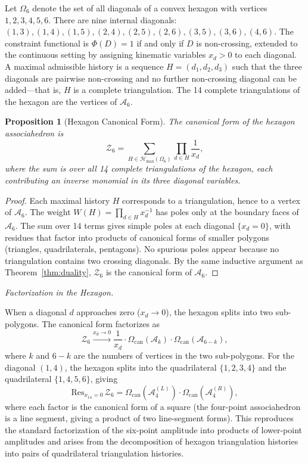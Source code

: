 \documentclass[12pt, oneside]{amsart}
\theoremstyle{plain}
\newtheorem{proposition}[theorem]{Proposition}
\theoremstyle{definition}
\theoremstyle{remark}
\newcommand{\Phif}{\Phi}
\newcommand{\OmKS}{\Omega}
\newcommand{\CF}{\Omega_{\mathrm{can}}}
\newcommand{\Hmax}{\mathcal{H}_{\max}}
\begin{document}
Let $\OmKS_6$ denote the set of all diagonals of a convex hexagon with vertices $1, 2, 3, 4, 5, 6$. There are nine internal diagonals: $(1,3), (1,4), (1,5), (2,4), (2,5), (2,6), (3,5), (3,6), (4,6)$. The constraint functional is $\Phif(D) = 1$ if and only if $D$ is non-crossing, extended to the continuous setting by assigning kinematic variables $x_d > 0$ to each diagonal. A maximal admissible history is a sequence $H = (d_1, d_2, d_3)$ such that the three diagonals are pairwise non-crossing and no further non-crossing diagonal can be added---that is, $H$ is a complete triangulation. The 14 complete triangulations of the hexagon are the vertices of $\mathcal{A}_6$.

\begin{proposition}[Hexagon Canonical Form]
\label{prop:hexagon}
The canonical form of the hexagon associahedron is
\begin{equation}
\label{eq:hexagon-Z}
  \mathcal{Z}_6 = \sum_{H \in \Hmax(\OmKS_6)} \prod_{d \in H} \frac{1}{x_d},
\end{equation}
where the sum is over all 14 complete triangulations of the hexagon, each contributing an inverse monomial in its three diagonal variables.
\end{proposition}

\begin{proof}
Each maximal history $H$ corresponds to a triangulation, hence to a vertex of $\mathcal{A}_6$. The weight $W(H) = \prod_{d \in H} x_d^{-1}$ has poles only at the boundary faces of $\mathcal{A}_6$. The sum over 14 terms gives simple poles at each diagonal $\{x_d = 0\}$, with residues that factor into products of canonical forms of smaller polygons (triangles, quadrilaterals, pentagons). No spurious poles appear because no triangulation contains two crossing diagonals. By the same inductive argument as Theorem~\ref{thm:duality}, $\mathcal{Z}_6$ is the canonical form of $\mathcal{A}_6$.
\end{proof}

\medskip\noindent\textit{Factorization in the Hexagon.}

When a diagonal $d$ approaches zero ($x_d \to 0$), the hexagon splits into two sub-polygons. The canonical form factorizes as
\[
  \mathcal{Z}_6 \xrightarrow{x_d \to 0} \frac{1}{x_d} \cdot \CF(\mathcal{A}_{k}) \cdot \CF(\mathcal{A}_{6-k}),
\]
where $k$ and $6-k$ are the numbers of vertices in the two sub-polygons. For the diagonal $(1,4)$, the hexagon splits into the quadrilateral $\{1,2,3,4\}$ and the quadrilateral $\{1,4,5,6\}$, giving
\[
  \mathrm{Res}_{x_{14}=0}\,\mathcal{Z}_6 = \CF(\mathcal{A}_4^{(L)}) \cdot \CF(\mathcal{A}_4^{(R)}),
\]
where each factor is the canonical form of a square (the four-point associahedron is a line segment, giving a product of two line-segment forms). This reproduces the standard factorization of the six-point amplitude into products of lower-point amplitudes and arises from the decomposition of hexagon triangulation histories into pairs of quadrilateral triangulation histories.
\end{document}
